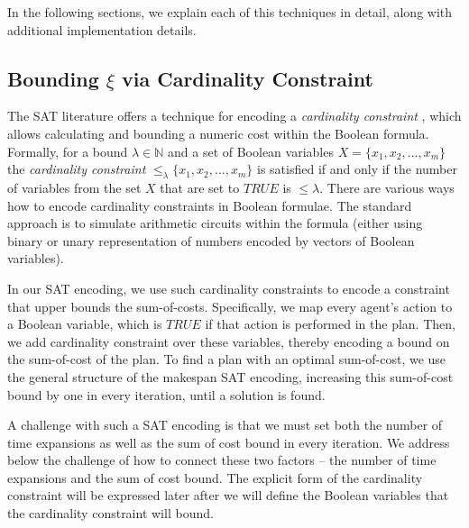 \documentclass[jair,oneside,11pt]{article}
\begin{document}
In the following sections, we explain each of this techniques in detail, along with additional implementation details.

\subsection{Bounding $\xi$ via Cardinality Constraint}


\noindent The SAT literature offers a technique for encoding a \textit{cardinality constraint} \cite{DBLP:conf/cp/SilvaL07,DBLP:conf/cp/Sinz05}, which allows calculating and bounding a numeric cost within the Boolean formula. Formally, for a bound $\lambda \in \mathbb{N}$ and a set of Boolean variables $X=\{x_1,x_2,...,x_m\}$ the \textit{cardinality constraint} $\leq_{\lambda}{\{x_1,x_2,...,x_m\}}$ is satisfied if and only if the number of variables from the set $X$ that are set to $\mathit{TRUE}$ is $ \leq \lambda$. There are various ways how to encode cardinality constraints in Boolean formulae. The standard approach is to simulate arithmetic circuits \cite{DBLP:conf/cp/BailleuxB03} within the formula (either using binary or unary representation of numbers encoded by vectors of Boolean variables).

In our SAT encoding, we use such cardinality constraints to encode a constraint that upper bounds the sum-of-costs. Specifically, we map every agent's action to a Boolean variable, which is $\mathit{TRUE}$ if that action is performed in the plan. Then, we add cardinality constraint over these variables, thereby encoding a bound on the sum-of-cost of the plan. To find a plan with an optimal sum-of-cost, we use the general structure of the makespan SAT encoding, increasing this sum-of-cost bound by one in every iteration, until a solution is found. 

A challenge with such a SAT encoding is that we must set both the number of time expansions as well as the sum of cost bound in every iteration. We address below the challenge of how to connect these two factors -- the number of time expansions and the sum of cost bound. The explicit form of the cardinality constraint will be expressed later after we will define the Boolean variables that the cardinality constraint will bound.
\end{document}
